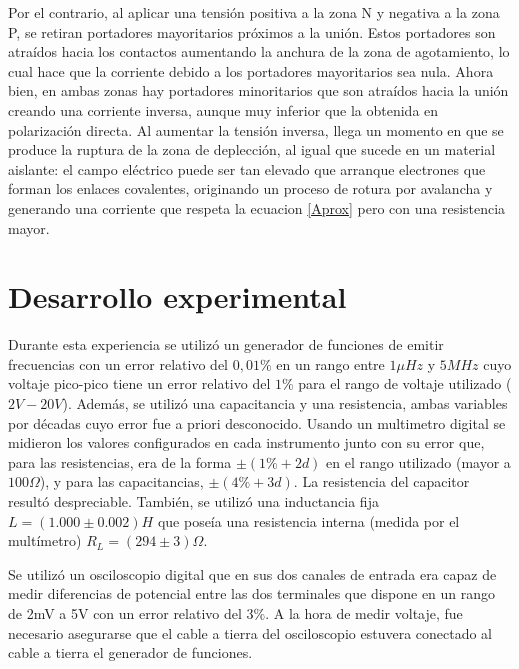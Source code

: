 \documentclass[11pt,a4paper]{article}
\begin{document}
 Por el contrario, al aplicar una tensión positiva a la zona N y negativa a la zona P, se retiran portadores mayoritarios próximos a la unión. Estos portadores son atraídos hacia los contactos aumentando la anchura de la zona de agotamiento, lo cual hace que la corriente debido a los portadores mayoritarios sea nula. Ahora bien, en ambas zonas hay portadores minoritarios que son atraídos hacia la unión creando una corriente inversa, aunque muy inferior que la obtenida en polarización directa. Al aumentar la tensión inversa, llega un momento en que se produce la ruptura de la zona de deplección, al igual que sucede en un material aislante: el campo eléctrico puede ser tan elevado que arranque electrones que forman los enlaces covalentes, originando un proceso de rotura por avalancha y generando una corriente que respeta la ecuacion \eqref{Aprox} pero con una resistencia mayor.




\section{Desarrollo experimental}

Durante esta experiencia se utilizó un generador de funciones de emitir frecuencias con un error relativo del $0,01\%$ en un rango entre $1\mu Hz$ y $5MHz$ cuyo voltaje pico-pico tiene un error relativo del $1\%$ para el rango de voltaje utilizado ($2V-20V$). Además, se utilizó una capacitancia y una resistencia, ambas variables por décadas cuyo error fue a priori desconocido. Usando un multimetro digital se midieron los valores configurados en cada instrumento junto con su error que, para las resistencias, era de la forma $\pm(1\%+2d)$ en el rango utilizado (mayor a $100\Omega$), y para las  capacitancias, $\pm(4\%+3d)$. La resistencia del capacitor resultó despreciable. También, se utilizó una inductancia fija $L = (1.000 \pm 0.002) H$ que poseía una resistencia interna (medida por el multímetro) $R_L = (294 \pm 3) \Omega$.

Se utilizó un osciloscopio digital que en sus dos canales de entrada era capaz de medir diferencias de potencial entre las dos terminales que dispone en un rango de 2mV a 5V con un error relativo del $3\%$. A la hora de medir voltaje, fue necesario asegurarse que el cable a tierra del osciloscopio estuvera conectado al cable a tierra el generador de funciones. 
\end{document}
